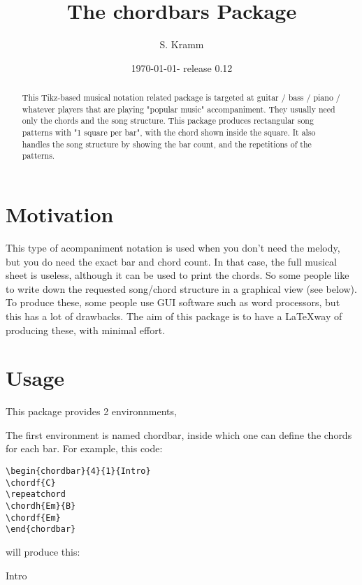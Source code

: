 \documentclass[11pt]{article}
\title{The chordbars Package}
\author{S. Kramm}
\date{\today - release 0.12}
\begin{document}
\maketitle

\begin{abstract}
This Tikz-based musical notation related package is targeted at guitar / bass / piano / whatever players that are playing "popular music" accompaniment.
They usually need only the chords and the song structure.
This package produces rectangular song patterns with "1 square per bar", with the chord shown inside the square.
It also handles the song structure by showing the bar count, and the repetitions of the patterns.
\end{abstract}

\section{Motivation}

This type of acompaniment notation is used when you don't need the melody, but you do need the exact bar and chord count.
In that case, the full musical sheet is useless, although it can be used to print the chords.
So some people like to write down the requested song/chord structure in a graphical view (see below). To produce these, some people use GUI software such as word processors, but this has a lot of drawbacks.
The aim of this package is to have a \LaTeX way of producing these, with minimal effort.


\section{Usage}
This package provides 2 environnments,

The first environment is named {\ttfamily chordbar}, inside which one can define the chords for each bar.
For example, this code:

\begin{lstlisting}
\begin{chordbar}{4}{1}{Intro}
\chordf{C}
\repeatchord
\chordh{Em}{B}
\chordf{Em}
\end{chordbar}
\end{lstlisting}

will produce this:

\begin{chordbar}{4}{1}{Intro}
\repeatchord
{}
\end{chordbar}
\end{document}
